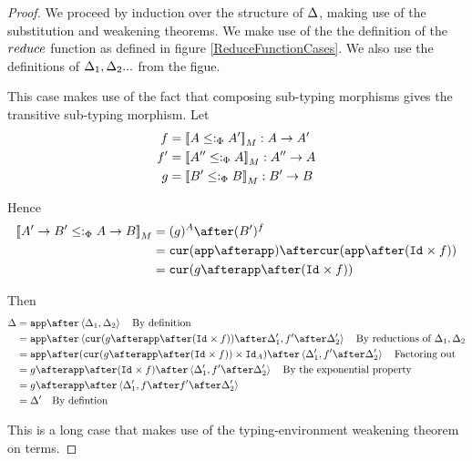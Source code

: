 \documentclass{Report}
\begin{document}
\begin{proof}
    We proceed by induction over the structure of $\Delta$, making use of the substitution and weakening theorems. We make use of the the definition of the $reduce$ function as defined in figure \ref{ReduceFunctionCases}. We also use the definitions of $\Delta_1, \Delta_2 ...$ from the figue. 
    
    This case makes use of the fact that composing sub-typing morphisms gives the transitive sub-typing morphism.
        Let
        \begin{align}
            f & = {\bf [\![}A\leq:_\Phi A'{\bf ]\!]}_M: A\rightarrow A' \\
            f' & = {\bf [\![}A''\leq:_\Phi A{\bf ]\!]}_M: A'' \rightarrow A \\
            g & = {\bf [\![}B' \leq:_\Phi B{\bf ]\!]}_M: B' \rightarrow B \\
        \end{align}

        Hence 
        \begin{align}
            \deno{\fntype{A'}{B'}\subtypep \ab} & = (g)^A \after (B')^f \\
            & = \cur{\app\after \app}\after\cur{\app\after(\Id{}\times f)}\\
            & = \cur {g\after\app\after(\Id{}\times f)}
        \end{align}

        Then 
        \begin{align}
            \D & = \app\after\pr{\D_1}{\D_2}\qt{By definition}\\
            & = \app\after\pr{\cur {g\after\app\after(\Id{}\times f)}\after\D'_1}{f'\after\D'_2}\qt{By reductions of $\D_1, \D_2$}\\
            & = \app\after(\cur {g\after\app\after(\Id{}\times f)}\times\Id{A})\after\pr{\D'_1}{f'\after\D'_2} \qt{Factoring out}\\
            & = g\after\app\after(\Id{}\times f)\after\pr{\D'_1}{f'\after\D'_2}\qt{By the exponential property}\\
            & = g\after\app\after\pr{\D'_1}{f\after f'\after \D'_2}\\
            & = \D'\qt{By defintion}
        \end{align}
        

    This is a long case that makes use of the typing-environment weakening theorem on terms.


\end{proof}
\end{document}
